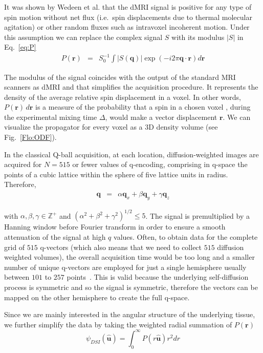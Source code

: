 \documentclass{bioinfo}
\begin{document}
\noindent It was shown by Wedeen et al. \cite{Wedeen} that the dMRI
signal is positive for any type of spin motion without net flux (i.e.~spin
displacements due to thermal molecular agitation) or other random
fluxes such as intravoxel incoherent motion. Under this assumption
we can replace the complex signal $S$ with its modulus $|S|$ in
Eq.~\ref{eq:P} \begin{eqnarray}
P(\mathbf{r}) & = & S_{0}^{-1}\int|S(\mathbf{q})|\exp(-i2\pi\mathbf{q}\cdot\mathbf{r})d\mathbf{r}\label{eq:P_modulus}\end{eqnarray}


The modulus of the signal coincides with the output of the standard
MRI scanners as dMRI and that simplifies the acquisition procedure.
It represents the density of the average relative spin displacement
in a voxel. In other words, $P(\mathbf{r})\, d\mathbf{r}$ is a measure
of the probability that a spin in a chosen voxel , during the experimental
mixing time $\Delta$, would make a vector displacement $\mathbf{r}$.
We can visualize the propagator for every voxel as a 3D density volume
(see Fig.~\ref{Flo:ODF}).

In the classical Q-ball acquisition, at each location, diffusion-weighted
images are acquired for $N=515$ or fewer values of q-encoding, comprising
in q-space the points of a cubic lattice within the sphere of five
lattice units in radius. Therefore,\begin{eqnarray}
\mathbf{q} & = & \alpha\mathbf{q}_{x}+\beta\mathbf{q}_{y}+\gamma\mathbf{q}_{z}\label{eq:q_lattice}\end{eqnarray}


\noindent with $\alpha,\beta,\gamma\in\mathbb{Z}^{+}$ and $(\alpha^{2}+\beta^{2}+\gamma^{2})^{1/2}\leq5$.
The signal is premultiplied by a Hanning window before Fourier transform
in order to ensure a smooth attenuation of the signal at high $q$
values. Often, to obtain data for the complete grid of $515$ q-vectors
(which also means that we need to collect $515$ diffusion weighted
volumes), the overall acquisition time would be too long and a smaller
number of unique q-vectors are employed for just a single hemisphere
usually between $101$ to $257$ points~\cite{Kuo}. This is valid
because the underlying self-diffusion process is symmetric and so
the signal is symmetric, therefore the vectors can be mapped on the
other hemisphere to create the full q-space. 

Since we are mainly interested in the angular structure of the underlying
tissue, we further simplify the data by taking the weighted radial
summation of $P(\mathbf{r})$\foreignlanguage{british}{\begin{equation}
\psi_{DSI}(\hat{\mathbf{u}})=\int_{0}^{\infty}P(r\hat{\mathbf{u}})r^{2}dr\label{eq:ODF_DSI}\end{equation}
}
\end{document}
